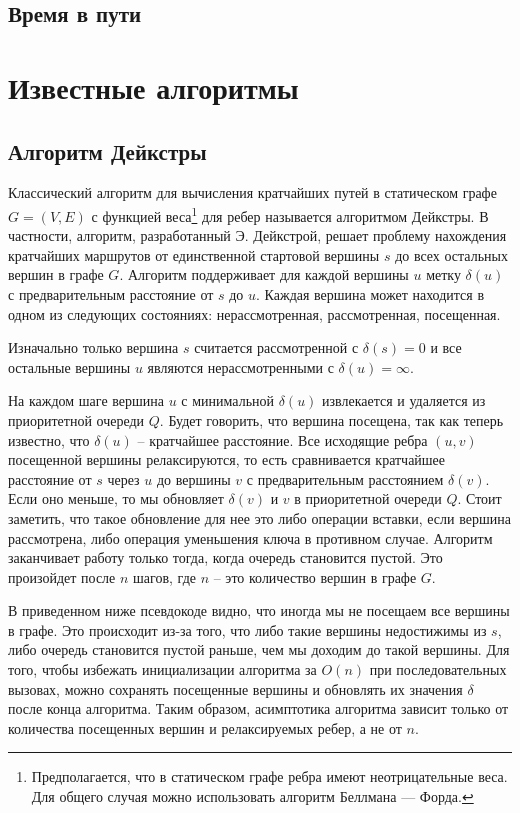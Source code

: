 \subsection{Время в пути}


\section{Известные алгоритмы}
\subsection{Алгоритм Дейкстры}
Классический алгоритм для вычисления кратчайших путей в статическом графе $G=(V, E)$ с функцией веса\footnote{Предполагается, что в статическом графе ребра имеют неотрицательные веса. Для общего случая можно использовать алгоритм Беллмана — Форда.} для ребер называется алгоритмом Дейкстры. В частности, алгоритм, разработанный Э. Дейкстрой, решает проблему нахождения кратчайших маршрутов от единственной стартовой вершины $s$ до всех остальных вершин в графе $G$. Алгоритм поддерживает для каждой вершины $u$ метку $\delta(u)$ с предварительным расстояние от $s$ до $u$. Каждая вершина может находится в одном из следующих состояниях: нерассмотренная, рассмотренная, посещенная. 

Изначально только вершина $s$ считается рассмотренной с $\delta(s)=0$ и все остальные вершины $u$ являются нерассмотренными с $\delta(u)=\infty$.

На каждом шаге вершина $u$ с минимальной $\delta(u)$ извлекается и удаляется из приоритетной очереди $Q$. Будет говорить, что вершина посещена, так как теперь известно, что $\delta(u)$ -- кратчайшее расстояние. Все исходящие ребра $(u, v)$ посещенной вершины релаксируются, то есть сравнивается кратчайшее расстояние от $s$ через $u$ до вершины $v$ с предварительным расстоянием $\delta(v)$. Если оно меньше, то мы обновляет $\delta(v)$ и $v$ в приоритетной очереди $Q$. Стоит заметить, что такое обновление для нее это либо операции вставки, если вершина рассмотрена, либо операция уменьшения ключа в противном случае. Алгоритм заканчивает работу только тогда, когда очередь становится пустой. Это произойдет после $n$ шагов, где $n$ -- это количество вершин в графе $G$.

В приведенном ниже псевдокоде видно, что иногда мы не посещаем все вершины в графе. Это происходит из-за того, что либо такие вершины недостижимы из $s$, либо очередь становится пустой раньше, чем мы доходим до такой вершины. Для того, чтобы избежать инициализации алгоритма за $O(n)$ при последовательных вызовах, можно сохранять посещенные вершины и обновлять их значения $\delta$ после конца алгоритма. Таким образом, асимптотика алгоритма зависит только от количества посещенных вершин и релаксируемых ребер, а не от $n$. 

